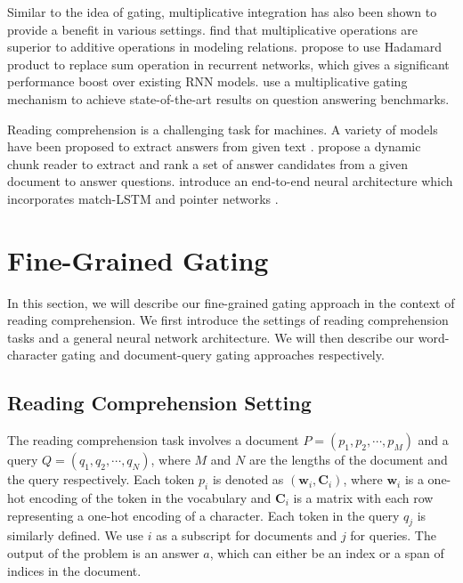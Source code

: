 \documentclass{article} \usepackage{iclr2017_conference,times}
\begin{document}
Similar to the idea of gating, multiplicative integration has also been shown to provide a benefit in various settings. \cite{yang2014learning} find that multiplicative operations are superior to additive operations in modeling relations. \cite{wu2016multiplicative} propose to use Hadamard product to replace sum operation in recurrent networks, which gives a significant performance boost over existing RNN models. \cite{dhingra2016gated} use a multiplicative gating mechanism to achieve state-of-the-art results on question answering benchmarks.

Reading comprehension is a challenging task for machines. A variety of models have been proposed to extract answers from given text \citep{hill2015goldilocks,kadlec2016text,trischler2016natural,chen2016thorough,sordoni2016iterative,cui2016attention}. \cite{yu2016chunk} propose a dynamic chunk reader to extract and rank a set of answer candidates from a given document to answer questions. \cite{wang2016machine} introduce an end-to-end neural architecture which incorporates match-LSTM and pointer networks \citep{vinyals2015pointer}.


 
\section{Fine-Grained Gating}

In this section, we will describe our fine-grained gating approach in the context of reading comprehension. We first introduce the settings of reading comprehension tasks and a general neural network architecture. We will then describe our word-character gating and document-query gating approaches respectively.

\subsection{Reading Comprehension Setting} \label{sec:setting}

The reading comprehension task involves a document $P = (p_1, p_2, \cdots, p_M)$ and a query $Q = (q_1, q_2, \cdots, q_N)$, where $M$ and $N$ are the lengths of the document and the query respectively. Each token $p_i$ is denoted as $(\mathbf{w}_i, \mathbf{C}_i)$, where $\mathbf{w}_i$ is a one-hot encoding of the token in the vocabulary and $\mathbf{C}_i$ is a matrix with each row representing a one-hot encoding of a character. Each token in the query $q_j$ is similarly defined. We use $i$ as a subscript for documents and $j$ for queries. The output of the problem is an answer $a$, which can either be an index or a span of indices in the document.
\end{document}
